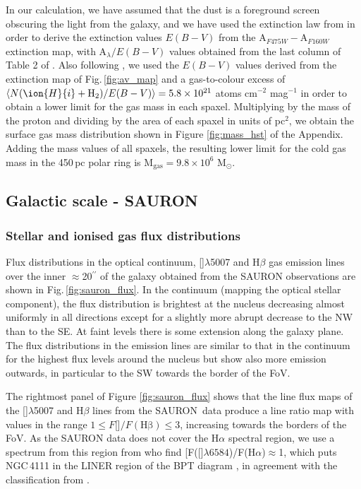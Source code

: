 \documentclass[fleqn,usenatbib]{mnras}
\begin{document}
In our calculation, we have assumed that the dust is a foreground screen obscuring the light from the galaxy, and we have used the extinction law from \citet{savage_observed_1979} in order to derive the extinction values $E(B-V)$ from the A$_{F475W}-$A$_{F160W}$ extinction map, with A$_\lambda/E(B-V)$ values obtained from the last column of Table 2 of \citet{savage_observed_1979}. Also following \citet{savage_observed_1979}, we used the $E(B-V)$ values derived from the extinction map of Fig.\,\ref{fig:av_map} and a gas-to-colour excess of $\langle N(\ion{H}{i} +\mathrm{H}_2)/E(B-V)\rangle = 5.8 \times 10^{21}$ atoms cm$^{-2}$ mag$^{-1}$ in order to obtain a lower limit for the gas mass in each spaxel. Multiplying by the mass of the proton and dividing by the area of each spaxel in units of pc$^2$, we obtain the surface gas mass distribution shown in Figure \ref{fig:mass_hst} of the Appendix. Adding the mass values of all spaxels, the resulting lower limit for the cold gas mass in the 450\,pc polar ring is M$_{\text{gas}} = 9.8 \times 10^{6}$ M$_\odot$. 


\subsection{Galactic scale - SAURON}

\subsubsection{Stellar and ionised gas flux distributions}

Flux distributions in the optical continuum, []$\lambda$5007 and H$\beta$ gas emission lines over the inner $\approx$20$^{\prime\prime}$ of the galaxy obtained from the SAURON observations are shown in Fig.\,\ref{fig:sauron_flux}. In the continuum (mapping the optical stellar component), the flux distribution is brightest at the nucleus decreasing almost uniformly in all directions except for a slightly more abrupt decrease to the NW than to the SE. At faint levels there is some extension along the galaxy plane. The flux distributions in the emission lines are similar to that in the continuum for the highest flux levels around the nucleus but show also more emission outwards, in particular to the SW towards the border of the FoV.

The rightmost panel of Figure \ref{fig:sauron_flux} shows that the line flux maps of the []$\lambda$5007 and H$\beta$ lines from the SAURON\ data produce a line ratio map with values in the range $1\le F$[]$/F(\mathrm{H\beta}) \le 3$, increasing towards the borders of the FoV. As the SAURON data does not cover the H$\alpha$ spectral region, we use a spectrum from this region from \citet{ho_search_1995} who find [F([]$\lambda6584$)/F(H$\alpha$)$\approx$1, which puts NGC\,4111 in the LINER region of the BPT diagram \citep{baldwin_classification_1981, kewley_theoretical_2001, kauffmann_host_2003, cid_fernandes_alternative_2010}, in agreement with the classification from \citet{nyland_atlas3d_2016}.
\end{document}
